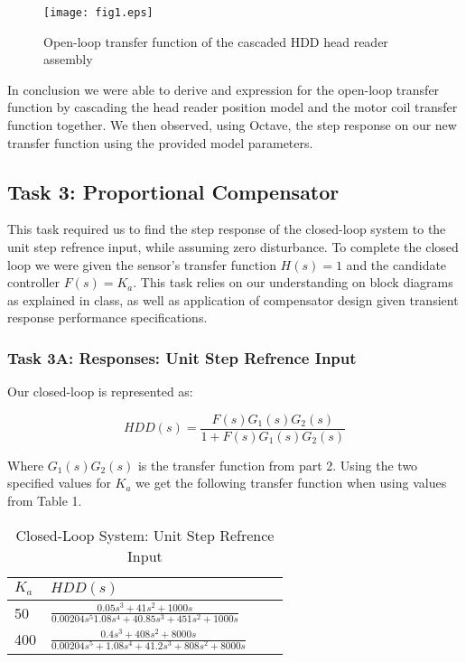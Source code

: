 \documentclass{article}
\begin{document}
\begin{figure}[H]
  \caption{Open-loop transfer function of the cascaded HDD head reader
    assembly}
  \centering
  \texttt{[image: fig1.eps]}
\end{figure}

In conclusion we were able to derive and expression for the open-loop
transfer function by cascading the head reader position model and the
motor coil transfer function together. We then observed, using Octave,
the step response on our new transfer function using the provided
model parameters.

\subsection*{Task 3: Proportional Compensator}

This task required us to find the step response of the closed-loop system to
the unit step refrence input, while assuming zero disturbance. To complete the
closed loop we were given the sensor's transfer function $H(s) = 1$ and the
candidate controller $F(s) = K_a$. This task relies on our understanding on
block diagrams as explained in class, as well as application of compensator
design given transient response performance specifications.

\subsubsection*{Task 3A: Responses: Unit Step Refrence Input}


Our closed-loop is represented as: 

$$HDD(s) = \frac{F(s)G_1(s)G_2(s)}{1 + F(s)G_1(s)G_2(s)}$$

Where $G_1(s)G_2(s)$ is the transfer function from part 2. Using the two 
specified values for $K_a$ we get the following transfer function when using
values from Table 1.

\begin{table}[H]
\begin{center}
  \begin{tabular}{ | l | l | l | p{5cm} |}
  \hline
  \textbf{$K_a$} & \textbf{$HDD(s)$}  \\ \hline
  50 & $\frac{0.05s^3 + 41s^2 + 1000s}{0.00204s^5 1.08s^4 + 40.85 s^3 
  + 451 s^2  + 1000s}$\\ \hline 
  400 & $\frac{0.4s^3 + 408s^2 + 8000s}{0.00204s^5 + 1.08s^4 + 41.2 s^3
  + 808 s^2 + 8000 s}$  \\ \hline
 \end{tabular}
\end{center}
\caption{Closed-Loop System: Unit Step Refrence Input}
\end{table}
\end{document}
